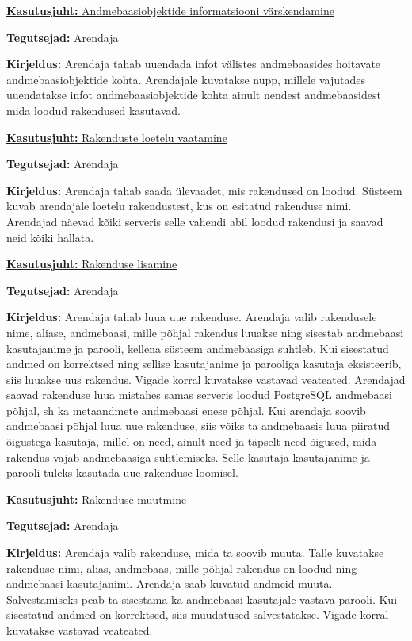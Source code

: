 \documentclass[a4paper,12pt]{article} %
\begin{document}
\underline{\textbf{Kasutusjuht:} Andmebaasiobjektide informatsiooni värskendamine}
\par
\textbf{Tegutsejad:} Arendaja
\par
\textbf{Kirjeldus:} Arendaja tahab uuendada infot välistes andmebaasides hoitavate andmebaasiobjektide kohta. Arendajale kuvatakse nupp, millele vajutades uuendatakse infot andmebaasiobjektide kohta ainult nendest andmebaasidest mida loodud rakendused kasutavad.
\par

\underline{\textbf{Kasutusjuht:} Rakenduste loetelu vaatamine}
\par
\textbf{Tegutsejad:} Arendaja
\par
\textbf{Kirjeldus:} Arendaja tahab saada ülevaadet, mis rakendused on loodud. Süsteem kuvab arendajale loetelu rakendustest, kus on esitatud rakenduse nimi. Arendajad näevad kõiki serveris selle vahendi abil loodud rakendusi ja saavad neid kõiki hallata.
\par

\underline{\textbf{Kasutusjuht:} Rakenduse lisamine}
\par
\textbf{Tegutsejad:} Arendaja
\par
\textbf{Kirjeldus:} Arendaja tahab luua uue rakenduse. Arendaja valib rakendusele nime, aliase, andmebaasi, mille põhjal rakendus luuakse ning sisestab andmebaasi kasutajanime ja parooli, kellena süsteem andmebaasiga suhtleb. Kui sisestatud andmed on korrektsed ning sellise kasutajanime ja parooliga kasutaja eksisteerib, siis luuakse uus rakendus. Vigade korral kuvatakse vastavad veateated.
Arendajad saavad rakenduse luua mistahes samas serveris loodud PostgreSQL andmebaasi põhjal, sh ka metaandmete andmebaasi enese põhjal. Kui arendaja soovib andmebaasi põhjal luua uue rakenduse, siis võiks ta andmebaasis luua piiratud õigustega kasutaja, millel on need, ainult need ja täpselt need õigused, mida rakendus vajab andmebaasiga suhtlemiseks. Selle kasutaja kasutajanime ja parooli tuleks kasutada uue rakenduse loomisel.
\par

\underline{\textbf{Kasutusjuht:} Rakenduse muutmine}
\par
\textbf{Tegutsejad:} Arendaja
\par
\textbf{Kirjeldus:} Arendaja valib rakenduse, mida ta soovib muuta. Talle kuvatakse rakenduse nimi, alias, andmebaas, mille põhjal rakendus on loodud ning andmebaasi kasutajanimi. Arendaja saab kuvatud andmeid muuta. Salvestamiseks peab ta sisestama ka andmebaasi kasutajale vastava parooli. Kui sisestatud andmed on korrektsed, siis muudatused salvestatakse. Vigade korral kuvatakse vastavad veateated.
\par
\end{document}
